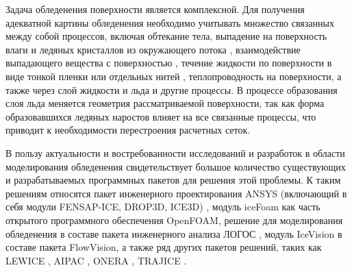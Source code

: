 
Задача обледенения поверхности является комплексной.
Для получения адекватной картины обледенения необходимо учитывать множество связанных между собой процессов, включая обтекание тела, выпадение на поверхность влаги и ледяных кристаллов из окружающего потока \cite{Cui2023Impingement}, взаимодействие выпадающего вещества с поверхностью \cite{Cui2021Impingement}, течение жидкости по поверхности в виде тонкой пленки или отдельных нитей \cite{Alexeenko2013Ice}, теплопроводность на поверхности, а также через слой жидкости и льда \cite{Xin2013Ice} и другие процессы.
В процессе образования слоя льда меняется геометрия рассматриваемой поверхности, так как форма образовавшихся ледяных наростов влияет на все связанные процессы, что приводит к необходимости перестроения расчетных сеток.


В пользу актуальности и востребованности исследований и разработок в области моделирования обледенения свидетельствует большое количество существующих и разрабатываемых программных пакетов для решения этой проблемы.
К таким решениям относятся пакет инженерного проектирования ANSYS (включающий в себя модули FENSAP-ICE, DROP3D, ICE3D) \cite{Martini2022IntroIce}, модуль iceFoam \cite{Koshelev2020Ice} как часть открытого программного обеспечения OpenFOAM\label{abbr:foam-1}, решение для моделирования обледенения в составе пакета инженерного анализа ЛОГОС \cite{Galanov2021IntroIce,Galanov2021IntoIceLOGOS}, модуль IceVision \cite{Sorokin2020Ice} в составе пакета FlowVision, а также ряд других пакетов решений, таких как LEWICE \cite{Shannon2019IntroIce}, AIPAC \cite{Domingos2015IceHeat}, ONERA \cite{Villedieu2014IntroIce}, TRAJICE \cite{Son2010IntroIce}.


